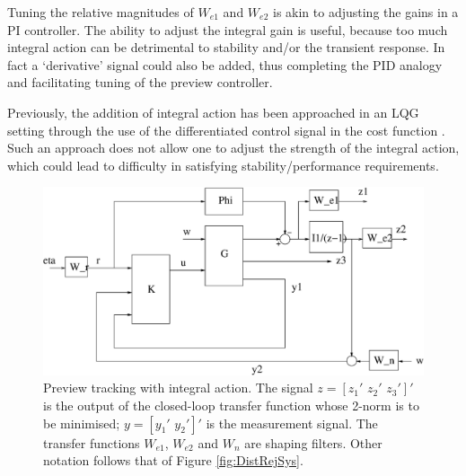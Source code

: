 \begin{description}
Tuning the relative magnitudes of $W_{e1}$ and $W_{e2}$ is akin to adjusting the gains in a PI controller. The ability to adjust the integral gain is useful, because too much integral action can be detrimental to stability and/or the transient response. In fact a `derivative' signal could also be added, thus completing the PID analogy and facilitating tuning of the preview controller. 

Previously, the addition of integral action has been approached in an {LQG} setting through the use of the differentiated control signal in the cost function \citep[e.g. ][]{Tomizuka_1979_IntegralPreviewFI,Katayama_1987_PreviewAndIntegral,Tomi_1980_FFPrev}. Such an approach does not allow one to adjust the strength of the integral action, which could lead to difficulty in satisfying stability/performance requirements. 


\begin{figure}
\begin{center}
\stdcontrolfrags
{}
\includegraphics[width=12cm]{./diags/TrackSysInteg.eps}
\end{center}
\caption{Preview tracking with integral action. The signal $z=\left[z_1'\,\,z_2'\,\,z_3'\right]'$ is the output of the closed-loop transfer function
whose 2-norm is to be minimised; $y=\left[y_1'\,\,y_2'\right]'$ is the measurement signal. The transfer functions $W_{e1}$, $W_{e2}$ and $W_n$ are shaping filters. Other notation follows that of Figure \ref{fig:DistRejSys}. \label{fig:TrackSysIntegDesign}}
\end{figure}

\end{description}
 


 





